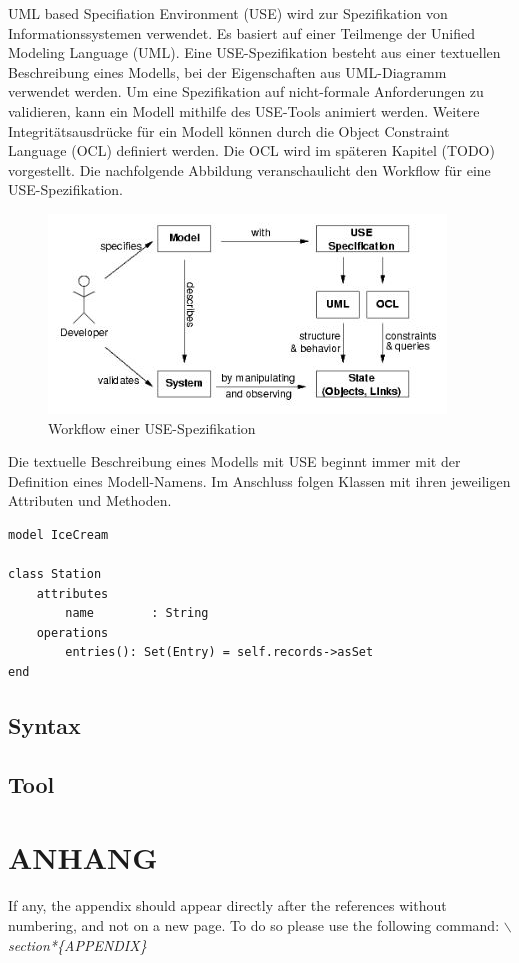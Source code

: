 \documentclass[a4paper,twoside]{article}
\begin{document}
UML based Specifiation Environment (USE) wird zur Spezifikation von Informationssystemen verwendet. Es basiert auf einer Teilmenge der Unified Modeling Language (UML). Eine USE-Spezifikation besteht aus einer textuellen Beschreibung eines Modells, bei der Eigenschaften aus UML-Diagramm verwendet werden. Um eine Spezifikation auf nicht-formale Anforderungen zu validieren, kann ein Modell mithilfe des USE-Tools animiert werden. Weitere Integritätsausdrücke für ein Modell können durch die Object Constraint Language (OCL) definiert werden. Die OCL wird im späteren Kapitel (TODO) vorgestellt. Die nachfolgende Abbildung veranschaulicht den Workflow für eine USE-Spezifikation.

\begin{figure}[h]
	\includegraphics[scale=.7]{pics/USE_workflow.jpg}
	\caption{Workflow einer USE-Spezifikation \cite{Data07}}
\end{figure}

Die textuelle Beschreibung eines Modells mit USE beginnt immer mit der Definition eines Modell-Namens. Im Anschluss folgen Klassen mit ihren jeweiligen Attributen und Methoden.

\lstset{basicstyle=\tiny,style=myCustomUseStyle}

\begin{lstlisting}
model IceCream

class Station
	attributes
		name		: String
	operations
		entries(): Set(Entry) = self.records->asSet
end
\end{lstlisting}



\subsection{Syntax}

\subsection{Tool}

\vfill

{\small
}

\section*{\uppercase{Anhang}}

\noindent If any, the appendix should appear directly after the
references without numbering, and not on a new page. To do so please use the following command:
\textit{$\backslash$section*\{APPENDIX\}}


\vfill
\end{document}
